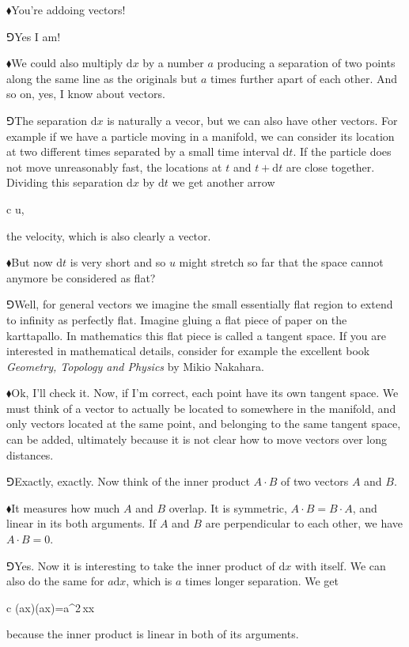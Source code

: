 \documentclass[10pt,oneside%
]{memoir}
\newenvironment{eqna}{\begin{IEEEeqnarray*}{c}}{\end{IEEEeqnarray*}\ignorespacesafterend}
\newcommand{\der}[2]{\frac{\dd#1}{\dd#2}}
\newcommand{\dd}{\mathrm{d}}
\newcommand{\hea}{\(\blacklozenge\)\;}
\newcommand{\heb}{\(\Game\)\;}
\begin{document}
\hea You're addoing vectors!

\heb Yes I am!

\hea We could also multiply \(\dd x\) by a number \(a\) producing a separation of two points along the same line as the originals but \(a\) times further apart of each other. And so on, yes, I know about vectors.

\heb The separation \(\dd x\) is naturally a vecor, but we can also have other vectors. For example if we have a particle moving in a manifold, we can consider its location at two different times separated by a small time interval \(\dd t\). If the particle does not move unreasonably fast, the locations at \(t\) and \(t+\dd t\) are close together. Dividing this separation \(\dd x\) by \(\dd t\) we get another arrow
\begin{eqna}
    \der{x}{t}\doteq u,
\end{eqna}
the velocity, which is also clearly a vector.

\hea But now \(\dd t\) is very short and so \(u\) might stretch so far that the space cannot anymore be considered as flat?

\heb Well, for general vectors we imagine the small essentially flat region to extend to infinity as perfectly flat. Imagine gluing a flat piece of paper on the karttapallo. In mathematics this flat piece is called a tangent space. If you are interested in mathematical details, consider for example the excellent book \emph{Geometry, Topology and Physics} by Mikio Nakahara.

\hea Ok, I'll check it. Now, if I'm correct, each point have its own tangent space. We must think of a vector to actually be located to somewhere in the manifold, and only vectors located at the same point, and belonging to the same tangent space, can be added, ultimately because it is not clear how to move vectors over long distances.

\heb Exactly, exactly. Now think of the inner product \(A\cdot B\) of two vectors \(A\) and \(B\).

\hea It measures how much \(A\) and \(B\) overlap. It is symmetric, \(A\cdot B=B\cdot A\), and linear in its both arguments. If \(A\) and \(B\) are perpendicular to each other, we have \(A\cdot B=0\).

\heb Yes. Now it is interesting to take the inner product of \(\dd x\) with itself. We can also do the same for \(a\dd x\), which is \(a\) times longer separation. We get
\begin{eqna}
    (a\dd x)\cdot(a\dd x)=a^2\,\dd x\cdot\dd x
\end{eqna}
because the inner product is linear in both of its arguments.
\end{document}
